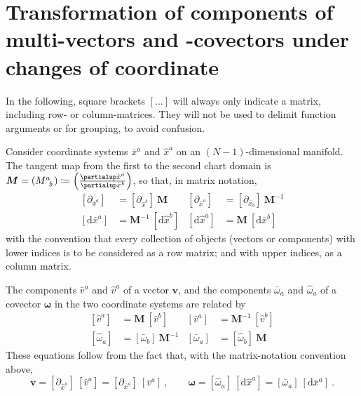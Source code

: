 \documentclass[\ifafour a4paper,12pt,\else a5paper,10pt,\fi%
onecolumn,oneside,article,%
british%
]{memoir}
\theoremstyle{remark}
\theoremstyle{innote}
\newcommand*{\de}{\partialup}%
\newcommand*{\di}{\mathrm{d}}%
\newcommand*{\defd}{\coloneqq}
\renewcommand*{\|}[1][]{\nonscript\:#1\vert\nonscript\:\mathopen{}}
\newcommand*{\hx}{\hat{x}}
\newcommand*{\lx}{\bar{x}}
\renewcommand*{\i}{\indices}
\begin{document}
\section{Transformation of components of multi-vectors and -covectors under
  changes of coordinate}
\label{sec:comp_transf}

In the following, square brackets $[\dotso]$ will always only indicate a matrix,
including row- or column-matrices. They will not be used to delimit
function arguments or for grouping, to avoid confusion.

\bigskip

Consider coordinate systems $\lx^{a}$ and $\hx^{a}$ on an $(N-1)$-dimensional
manifold. The tangent map from the first to the second chart domain is
$\bm{M} = (M\i{^{a}_{b}}) \defd \Bigl(\frac{\de \hx^{a}}{\de \lx^{b}}\Bigr)$,
so that, in matrix notation,
\begin{align}
  \label{eq:base_coord_vec_tr}
  [\de_{\lx^{a}}] &=  [\de_{\hx^{b}}]\ \bm{M}
  &
    [\de_{\hx^{a}}] &= [\de_{\lx_{b}}]\ \bm{M}^{-1}
  \\
  \label{eq:base_coord_covec_tr}
  [\di \lx^{a}] &= \bm{M}^{-1}\ [\di\hx^{b}]
  &
    [\di\hx^{a}] &= \bm{M}\ [\di \lx^{b}]
\end{align}
with the convention that every collection of objects (vectors or
components) with lower indices is to be considered as a row matrix; and
with upper indices, as a column matrix.

The components $\bar{v}^{a}$ and $\hat{v}^{a}$ of a vector $\bm{v}$, and the
components $\bar{\omega}_{a}$ and $\hat{\omega}_{a}$ of a covector $\bm{\omega}$
in the two coordinate systems are related by
\begin{align}
  \label{eq:comp_vec_tr}
  [\hat{v}^{a}] &= \bm{M}\ [\bar{v}^{b}]
  &
    [\bar{v}^{a}] &= \bm{M}^{-1}\ [\hat{v}^{b}]
  \\
  \label{eq:comp_covec_tr}
  [\hat{\omega}_{a}] &= [\bar{\omega}_{b}]\ \bm{M}^{-1}
  &
    [\bar{\omega}_{a}] &= [\hat{\omega}_{b}]\ \bm{M}
\end{align}
These equations follow from the fact that, with the matrix-notation
convention above,
\begin{equation}
  \label{eq:matrix_comps}
  \bm{v} = [\de_{\hx^{a}}]\ [\hat{v}^{a}] = [\de_{\lx^{a}}]\ [\bar{v}^{a}]
  \ ,
  \qquad
  \bm{\omega} = [\hat{\omega}_{a}]\ [\di\hx^{a}] = [\bar{\omega}_{a}]\
  [\di\lx^{a}]
  \ .
\end{equation}

\bigskip
\end{document}
